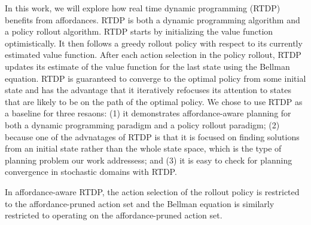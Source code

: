 \documentclass[]{article}
\begin{document}
In this work, we will explore how real time dynamic programming
(RTDP)~\citep{barto95} benefits from affordances. RTDP is both a
dynamic programming algorithm and a policy rollout algorithm. RTDP
starts by initializing the value function optimistically. It then
follows a greedy rollout policy with respect to its currently
estimated value function. After each action selection in the policy
rollout, RTDP updates its estimate of the value function for the last
state using the Bellman equation. RTDP is guaranteed to converge to
the optimal policy from some initial state and has the advantage that
it iteratively refocuses its attention to states that are likely to be
on the path of the optimal policy. We chose to use RTDP as a baseline
for three resaons: (1) it demonstrates affordance-aware planning for
both a dynamic programming paradigm and a policy rollout paradigm;
(2) because one of the advnatages of RTDP is that it is focused
on finding solutions from an initial state rather than the whole
state space, which is the type of planning problem our work addressess;
and (3) it is easy to check for planning convergence in stochastic domains
with RTDP.

In affordance-aware RTDP, the action selection of the rollout policy
is restricted to the affordance-pruned action set and the Bellman
equation is similarly restricted to operating on the affordance-pruned
action set.



%
%


%
\end{document}

